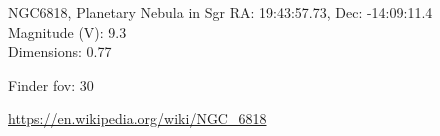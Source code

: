 \begin{block}{NGC6818, Planetary Nebula in Sgr}
    RA: 19:43:57.73, Dec: -14:09:11.4 \\ 
    Magnitude (V): 9.3 \\ 
    Dimensions: 0.77 

    Finder fov: 30 

    \url{https://en.wikipedia.org/wiki/NGC_6818} 
\end{block}